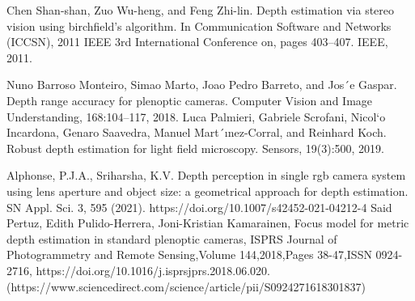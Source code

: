  Chen Shan-shan, Zuo Wu-heng, and Feng Zhi-lin. Depth estimation via stereo vision using birchfield’s algorithm. In Communication Software
and Networks (ICCSN), 2011 IEEE 3rd International Conference on,
pages 403–407. IEEE, 2011.

 Nuno Barroso Monteiro, Simao Marto, Joao Pedro Barreto, and Jos´e Gaspar. Depth range accuracy for plenoptic cameras. Computer Vision
and Image Understanding, 168:104–117, 2018.
 Luca Palmieri, Gabriele Scrofani, Nicol`o Incardona, Genaro Saavedra, Manuel Mart´ınez-Corral, and Reinhard Koch. Robust depth estimation
for light field microscopy. Sensors, 19(3):500, 2019.

 Alphonse, P.J.A., Sriharsha, K.V. Depth perception in single rgb camera system using lens aperture and object size: a geometrical approach for depth estimation. SN Appl. Sci. 3, 595 (2021). https://doi.org/10.1007/s42452-021-04212-4
Said Pertuz, Edith Pulido-Herrera, Joni-Kristian Kamarainen,
Focus model for metric depth estimation in standard plenoptic cameras,
ISPRS Journal of Photogrammetry and Remote Sensing,Volume 144,2018,Pages 38-47,ISSN 0924-2716,
https://doi.org/10.1016/j.isprsjprs.2018.06.020.
(https://www.sciencedirect.com/science/article/pii/S0924271618301837)
